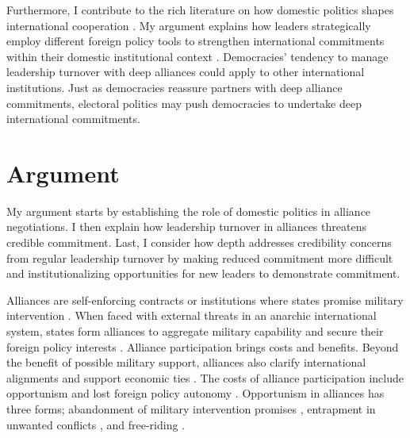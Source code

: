 \documentclass[12pt]{article}
\begin{document}
Furthermore, I contribute to the rich literature on how domestic politics shapes international cooperation \citep{DownesRocke1995, Fearon1998, Leeds1999, Mattes2012a, MattesRodriguez2014}.
My argument explains how leaders strategically employ different foreign policy tools to strengthen international commitments within their domestic institutional context \citep{HydeSaunders2020}.  
Democracies' tendency to manage leadership turnover with deep alliances could apply to other international institutions. 
Just as democracies reassure partners with deep alliance commitments, electoral politics may push democracies to undertake deep international commitments.




\section{Argument}


My argument starts by establishing the role of domestic politics in alliance negotiations. 
I then explain how leadership turnover in alliances threatens credible commitment. 
Last, I consider how depth addresses credibility concerns from regular leadership turnover by making reduced commitment more difficult and institutionalizing opportunities for new leaders to demonstrate commitment. 


Alliances are self-enforcing contracts or institutions where states promise military intervention \citep{Leedsetal2002, Morrow2000}. 
When faced with external threats in an anarchic international system, states form alliances to aggregate military capability and secure their foreign policy interests \citep{Snyder1997, FordhamPoast2014}.
Alliance participation brings costs and benefits.
Beyond the benefit of possible military support, alliances also clarify international alignments \citep{Snyder1997} and support economic ties \citep{Gowa1995, Long2003, Fordham2010, WolfordKim2017}.  
The costs of alliance participation include opportunism and lost foreign policy autonomy \citep{Altfield1984, Morrow2000, Johnson2015}. 
Opportunism in alliances has three forms; abandonment of military intervention promises \citep{BerkemeierFuhrmann2018}, entrapment in unwanted conflicts \citep{Snyder1984}, and free-riding \citep{Morrow2000}.
\end{document}
